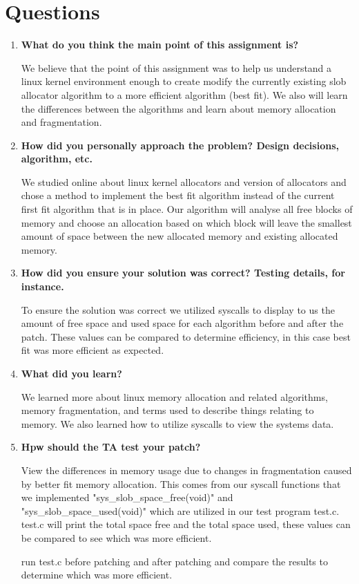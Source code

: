 \documentclass[onecolumn, draftclsnofoot,10pt, compsoc]{IEEEtran}
\begin{document}
\section{Questions}
	\begin{enumerate}
		\item \textbf{What do you think the main point of this assignment is?}
	
		We believe that the point of this assignment was to help us understand a linux kernel
		environment enough to create modify the currently existing slob allocator algorithm to a more efficient algorithm (best fit).
		We also will learn the differences between the algorithms and learn about memory allocation and fragmentation. 
		
		\item \textbf{How did you personally approach the problem? Design decisions, algorithm, etc.}
	
		We studied online about linux kernel allocators and version of allocators and chose a method 
		to implement the best fit algorithm instead of the current first fit algorithm that is in place.
		Our algorithm will analyse all free blocks of memory and choose an allocation based on which block 
		will leave the smallest amount of space between the new allocated memory and existing allocated memory.
		
		\item \textbf{How did you ensure your solution was correct? Testing details, for instance.}
			
		To ensure the solution was correct we utilized syscalls to display to us the amount of free space and used space for each algorithm before and after the patch.
		These values can be compared to determine efficiency, in this case best fit was more efficient as expected.

		
		\item \textbf{What did you learn?}
	
		We learned more about linux memory allocation and related algorithms, memory fragmentation, and terms used to describe
		things relating to memory. We also learned how to utilize syscalls to view the systems data.
		
		\item \textbf{Hpw should the TA test your patch?}
		
		View the differences in memory usage due to changes in fragmentation caused by better fit memory allocation. 
		This comes from our syscall functions that we implemented "sys_slob_space_free(void)" and "sys_slob_space_used(void)" which are utilized in our test program test.c.
		test.c will print the total space free and the total space used, these values can be compared to see which was more efficient.
		
		run test.c before patching and after patching and compare the results to determine which was more efficient.
		
	\end{enumerate}
\end{document}
